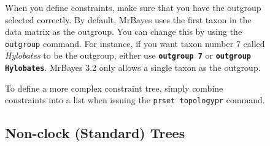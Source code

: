 \documentclass[12pt]{book}
\newcommand{\ttt}[1]{\texttt{#1}}
\newcommand{\tb}[1]{\ttt{\textbf{#1}}}
\begin{document}
\begin{figure}[h]
When you define constraints, make sure that you have the outgroup selected correctly. By default,
MrBayes uses the first taxon in the data matrix as the outgroup. You can change this by using the
\ttt{outgroup} command. For instance, if you want taxon number 7 called \textit{Hylobates} to be
the outgroup, either use \tb{outgroup 7} or \tb{outgroup Hylobates}. MrBayes 3.2 only allows a
single taxon as the outgroup.

To define a more complex constraint tree, simply combine constraints into a list when issuing the
\ttt{prset topologypr} command.

\subsection{Non-clock (Standard) Trees}


\end{figure}
\end{document}
